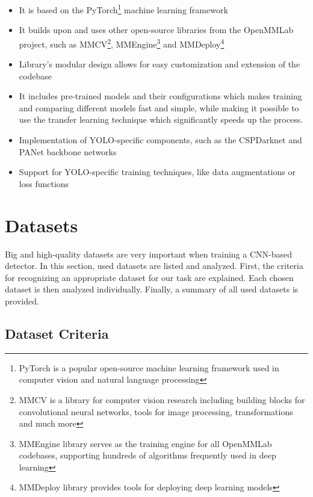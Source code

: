 \begin{itemize}
    \item It is based on the PyTorch\footnote{PyTorch is a popular open-source
    machine learning framework used in computer vision and natural language
    processing} machine learning framework
    \item It builds upon and uses other open-source libraries from the OpenMMLab
    project, such as MMCV\footnote{MMCV is a library for computer vision
    research including building blocks for convolutional neural networks, tools
    for image processing, transformations and much more},
    MMEngine\footnote{MMEngine library serves as the training engine for all
    OpenMMLab codebases, supporting hundreds of algorithms frequently used in
    deep learning} and MMDeploy\footnote{MMDeploy library provides tools for
    deploying deep learning models}
    \item Library's modular design allows for easy customization and extension
    of the codebase
    \item It includes pre-trained models and their configurations which makes
    training and comparing different models fast and simple, while making it
    possible to use the transfer learning technique which significantly speeds up the
    process.
    \item Implementation of YOLO-specific components, such as the CSPDarknet and
    PANet backbone networks
    \item Support for YOLO-specific training techniques, like data augmentations
    or loss functions
\end{itemize}





\chapter{Datasets}

Big and high-quality datasets are very important when training a CNN-based
detector. In this section, used datasets are listed and analyzed. First, the
criteria for recognizing an appropriate dataset for our task are explained. Each
chosen dataset is then analyzed individually. Finally, a summary of all used
datasets is provided.

\section{Dataset Criteria}

